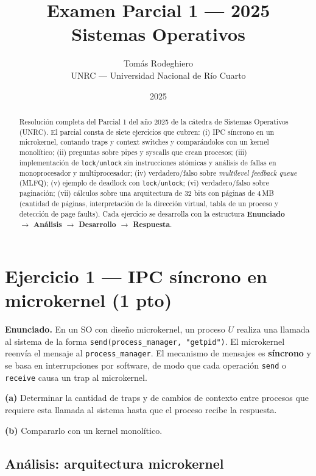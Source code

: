 \documentclass[11pt,a4paper]{article}
\title{
    \vspace{-2.5em}
    \textbf{Examen Parcial 1 --- 2025} \\[0.3em]
    \large Sistemas Operativos
}
\author{
    Tomás Rodeghiero \\
    \small UNRC --- Universidad Nacional de Río Cuarto
}
\date{2025}
\begin{document}
\maketitle

\begin{abstract}
\noindent
Resolución completa del Parcial 1 del año 2025 de la cátedra de
Sistemas Operativos (UNRC). El parcial consta de siete ejercicios
que cubren: (i) IPC síncrono en un microkernel, contando traps y
context switches y comparándolos con un kernel monolítico; (ii)
preguntas sobre pipes y syscalls que crean procesos; (iii)
implementación de \texttt{lock}/\texttt{unlock} sin instrucciones
atómicas y análisis de fallas en monoprocesador y multiprocesador;
(iv) verdadero/falso sobre \emph{multilevel feedback queue} (MLFQ);
(v) ejemplo de deadlock con \texttt{lock}/\texttt{unlock}; (vi)
verdadero/falso sobre paginación; (vii) cálculos sobre una
arquitectura de 32 bits con páginas de 4\,MB (cantidad de páginas,
interpretación de la dirección virtual, tabla de un proceso y
detección de page faults). Cada ejercicio se desarrolla con la
estructura \textbf{Enunciado $\to$ Análisis $\to$ Desarrollo $\to$
Respuesta}.
\end{abstract}

\tableofcontents
\bigskip

\section{Ejercicio 1 --- IPC síncrono en microkernel (1 pto)}

\textbf{Enunciado.} En un SO con diseño microkernel, un proceso $U$
realiza una llamada al sistema de la forma
\texttt{send(process\_manager, "getpid")}. El microkernel reenvía el
mensaje al \texttt{process\_manager}. El mecanismo de mensajes es
\textbf{síncrono} y se basa en interrupciones por software, de modo
que cada operación \texttt{send} o \texttt{receive} causa un trap al
microkernel.

\textbf{(a)} Determinar la cantidad de traps y de cambios de
contexto entre procesos que requiere esta llamada al sistema hasta
que el proceso recibe la respuesta.

\textbf{(b)} Compararlo con un kernel monolítico.

\subsection*{Análisis: arquitectura microkernel}
\end{document}
